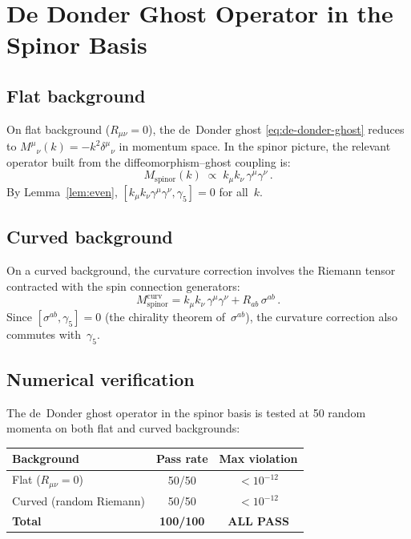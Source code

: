 \documentclass[11pt,a4paper]{article}
\begin{document}
\section{De Donder Ghost Operator in the Spinor Basis}
\label{sec:ghost}

\subsection{Flat background}

On flat background ($R_{\mu\nu} = 0$), the de~Donder ghost
\eqref{eq:de-donder-ghost} reduces to
$M^\mu{}_\nu(k) = -k^2\delta^\mu{}_\nu$ in momentum space.
In the spinor picture, the relevant operator built from the
diffeomorphism--ghost coupling is:
\begin{equation}\label{eq:ghost-flat}
  M_{\mathrm{spinor}}(k) \;\propto\;
  k_\mu k_\nu\, \gamma^\mu\gamma^\nu \,.
\end{equation}
By Lemma~\ref{lem:even},
$[k_\mu k_\nu \gamma^\mu\gamma^\nu, \gamma_5] = 0$ for all~$k$.

\subsection{Curved background}

On a curved background, the curvature correction involves the
Riemann tensor contracted with the spin connection generators:
\begin{equation}\label{eq:ghost-curved}
  M_{\mathrm{spinor}}^{\mathrm{curv}}
  = k_\mu k_\nu\,\gamma^\mu\gamma^\nu
  + R_{ab}\,\sigma^{ab} \,.
\end{equation}
Since $[\sigma^{ab}, \gamma_5] = 0$ (the chirality theorem of~$\sigma^{ab}$),
the curvature correction also commutes with~$\gamma_5$.

\subsection{Numerical verification}

The de~Donder ghost operator in the spinor basis is tested at 50
random momenta on both flat and curved backgrounds:

\begin{center}
\begin{tabular}{lcc}
\toprule
Background & Pass rate & Max violation \\
\midrule
Flat ($R_{\mu\nu} = 0$) & 50/50 & $< 10^{-12}$ \\
Curved (random Riemann) & 50/50 & $< 10^{-12}$ \\
\midrule
\textbf{Total} & \textbf{100/100} & \textcolor{proven}{\textbf{ALL PASS}} \\
\bottomrule
\end{tabular}
\end{center}
\end{document}
